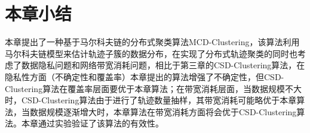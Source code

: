 





\section{本章小结}

本章提出了一种基于马尔科夫链的分布式聚类算法MCD-Clustering，该算法利用马尔科夫链模型来估计轨迹子簇的数据分布，在实现了分布式轨迹聚类的同时也考虑了数据隐私问题和网络带宽消耗问题，相比于第三章的CSD-Clustering算法，在隐私性方面（不确定性和覆盖率）本章提出的算法增强了不确定性，但CSD-Clustering算法在覆盖率层面要优于本章算法；在带宽消耗层面，当数据规模不大时，CSD-Clustering算法由于进行了轨迹数量抽样，其带宽消耗可能略优于本章算法，当数据规模逐渐增大时，本章算法在带宽消耗方面将会优于CSD-Clustering算法。本章通过实验验证了该算法的有效性。
